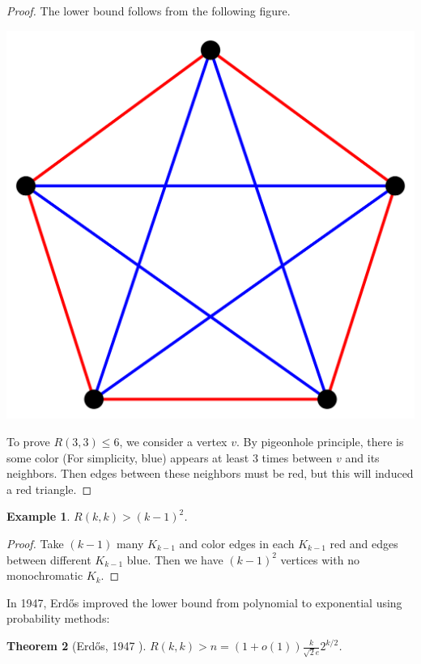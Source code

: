 \documentclass{article}
\newtheorem{theorem}{Theorem}[section]
\newtheorem{example}[theorem]{Example}
\theoremstyle{definition}
\def\Erdos{Erd\H{o}s}
\begin{document}
\begin{proof}
    The lower bound follows from the following figure.
    \begin{center}
        \includegraphics[scale=0.1]{1-1.png}
    \end{center}
    To prove $R(3,3)\leq 6$, we consider a vertex $v$. By pigeonhole principle, there is some color (For simplicity, blue) appears at least 3 times between $v$ and its neighbors. Then edges between these neighbors must be red, but this will induced a red triangle.
\end{proof}

\begin{example}
    $R(k,k)>(k-1)^{2}$.
\end{example}

\begin{proof}
    Take $(k-1)$ many $K_{k-1}$ and color edges in each $K_{k-1}$ red and edges between different $K_{k-1}$ blue. Then we have $(k-1)^{2}$ vertices with no monochromatic $K_{k}$.
\end{proof}

In 1947, \Erdos{} \cite{Erds1947SomeRO} improved the lower bound from polynomial to exponential using probability methods:

\begin{theorem}[\Erdos{}, 1947 \cite{Erds1947SomeRO}]
    $R(k,k)>n=(1+o(1))\frac{k}{\sqrt{2}e}2^{k/2}$.
\end{theorem}
\end{document}
